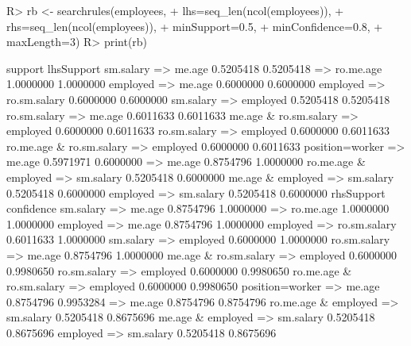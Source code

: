 \documentclass{article}\usepackage[]{graphicx}\usepackage[]{color}
\begin{document}
\begin{Schunk}
% --begin: "searchrules"
\begin{Sinput}
R> rb <- searchrules(employees,
+                    lhs=seq_len(ncol(employees)),
+                    rhs=seq_len(ncol(employees)),
+                    minSupport=0.5,
+                    minConfidence=0.8,
+                    maxLength=3)
R> print(rb)
\end{Sinput}
\begin{Soutput}
                                       support lhsSupport
sm.salary => me.age                  0.5205418  0.5205418
 => ro.me.age                        1.0000000  1.0000000
employed => me.age                   0.6000000  0.6000000
employed => ro.sm.salary             0.6000000  0.6000000
sm.salary => employed                0.5205418  0.5205418
ro.sm.salary => me.age               0.6011633  0.6011633
me.age & ro.sm.salary => employed    0.6000000  0.6011633
ro.sm.salary => employed             0.6000000  0.6011633
ro.me.age & ro.sm.salary => employed 0.6000000  0.6011633
position=worker => me.age            0.5971971  0.6000000
 => me.age                           0.8754796  1.0000000
ro.me.age & employed => sm.salary    0.5205418  0.6000000
me.age & employed => sm.salary       0.5205418  0.6000000
employed => sm.salary                0.5205418  0.6000000
                                     rhsSupport confidence
sm.salary => me.age                   0.8754796  1.0000000
 => ro.me.age                         1.0000000  1.0000000
employed => me.age                    0.8754796  1.0000000
employed => ro.sm.salary              0.6011633  1.0000000
sm.salary => employed                 0.6000000  1.0000000
ro.sm.salary => me.age                0.8754796  1.0000000
me.age & ro.sm.salary => employed     0.6000000  0.9980650
ro.sm.salary => employed              0.6000000  0.9980650
ro.me.age & ro.sm.salary => employed  0.6000000  0.9980650
position=worker => me.age             0.8754796  0.9953284
 => me.age                            0.8754796  0.8754796
ro.me.age & employed => sm.salary     0.5205418  0.8675696
me.age & employed => sm.salary        0.5205418  0.8675696
employed => sm.salary                 0.5205418  0.8675696
\end{Soutput}
%
% --end: "searchrules"
\end{Schunk}
\end{document}
